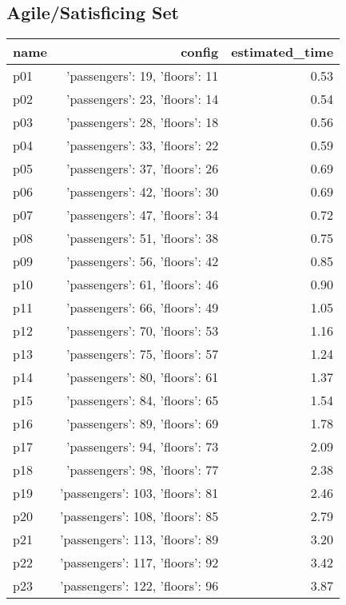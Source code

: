 \documentclass{article}
\begin{document}
                                \subsection*{Agile/Satisficing Set}
                                
                            \begin{center}
                            \scriptsize
                            \begin{tabular}{@{}l|r|r@{}}
                            name & config & estimated\_time\\\midrule
                              p01&{'passengers': 19, 'floors': 11}&0.53\\
  p02&{'passengers': 23, 'floors': 14}&0.54\\
  p03&{'passengers': 28, 'floors': 18}&0.56\\
  p04&{'passengers': 33, 'floors': 22}&0.59\\
  p05&{'passengers': 37, 'floors': 26}&0.69\\
  p06&{'passengers': 42, 'floors': 30}&0.69\\
  p07&{'passengers': 47, 'floors': 34}&0.72\\
  p08&{'passengers': 51, 'floors': 38}&0.75\\
  p09&{'passengers': 56, 'floors': 42}&0.85\\
  p10&{'passengers': 61, 'floors': 46}&0.90\\
  p11&{'passengers': 66, 'floors': 49}&1.05\\
  p12&{'passengers': 70, 'floors': 53}&1.16\\
  p13&{'passengers': 75, 'floors': 57}&1.24\\
  p14&{'passengers': 80, 'floors': 61}&1.37\\
  p15&{'passengers': 84, 'floors': 65}&1.54\\
  p16&{'passengers': 89, 'floors': 69}&1.78\\
  p17&{'passengers': 94, 'floors': 73}&2.09\\
  p18&{'passengers': 98, 'floors': 77}&2.38\\
  p19&{'passengers': 103, 'floors': 81}&2.46\\
  p20&{'passengers': 108, 'floors': 85}&2.79\\
  p21&{'passengers': 113, 'floors': 89}&3.20\\
  p22&{'passengers': 117, 'floors': 92}&3.42\\
  p23&{'passengers': 122, 'floors': 96}&3.87\\

\end{tabular}
\end{center}
\end{document}
